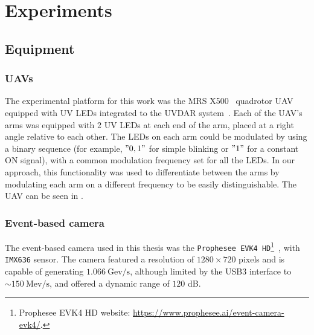 
\chapter{Experiments\label{chap:experiments}}

\section{Equipment}

\subsection{UAVs}
The experimental platform for this work was the \ac{MRS} X500~\cite{hertmrs} quadrotor \ac{UAV} equipped with \ac{UV} \ac{LED}s
integrated to the UVDAR system~\cite{walteruvdar}.
Each of the \ac{UAV}'s arms was equipped with 2 \ac{UV} \ac{LED}s at each end of the arm, placed at a right angle relative to each other.
The \ac{LED}s on each arm could be modulated
by using a binary sequence (for example, $"0, 1"$ for simple blinking or $"1"$ for a constant ON signal), with a common modulation frequency set for all the \ac{LED}s.
In our approach, this functionality was used to differentiate between the arms by modulating each arm on a different frequency to be easily distinguishable.
The \ac{UAV} can be seen in .

\subsection{Event-based camera}
The event-based camera used in this thesis was the \texttt{Prophesee EVK4 HD}\footnote{Prophesee EVK4 HD website: \url{https://www.prophesee.ai/event-camera-evk4/}.}~\cite{propheseeevk4},
with \texttt{IMX636} sensor. The camera featured a resolution of $1280 \times 720$ pixels and is capable of generating $1.066\ \text{Gev}/\text{s}$,
although limited by the USB3 interface to $\sim 150\ \text{Mev}/\text{s}$, and offered a dynamic range of $120$ dB.

